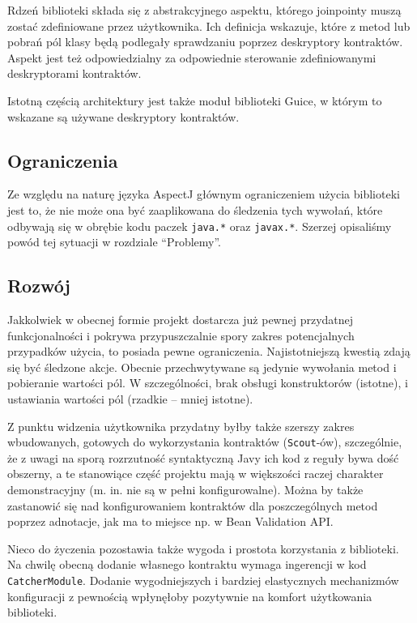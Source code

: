 \documentclass[12pt,a4paper,titlepage]{article}
\begin{document}
   Rdzeń biblioteki składa się z abstrakcyjnego aspektu, którego joinpointy muszą zostać zdefiniowane przez użytkownika. Ich definicja wskazuje, które z metod lub pobrań pól klasy będą podlegały sprawdzaniu poprzez deskryptory kontraktów. Aspekt jest też odpowiedzialny za odpowiednie sterowanie zdefiniowanymi deskryptorami kontraktów.
   
   Istotną częścią architektury jest także moduł biblioteki Guice, w którym to wskazane są używane deskryptory kontraktów.

  \subsection{Ograniczenia}
   Ze względu na naturę języka AspectJ głównym ograniczeniem użycia biblioteki jest to, że nie może ona być zaaplikowana do śledzenia tych wywołań, które odbywają się w obrębie kodu paczek \texttt{java.*} oraz \texttt{javax.*}. Szerzej opisaliśmy powód tej sytuacji w rozdziale ``Problemy''.

  \subsection{Rozwój}
   Jakkolwiek w obecnej formie projekt dostarcza już pewnej przydatnej funkcjonalności i pokrywa przypuszczalnie spory zakres potencjalnych przypadków użycia, to posiada pewne ograniczenia. Najistotniejszą kwestią zdają się być śledzone akcje. Obecnie przechwytywane są jedynie wywołania metod i pobieranie wartości pól. W szczególności, brak obsługi konstruktorów (istotne), i ustawiania wartości pól (rzadkie -- mniej istotne).

   Z punktu widzenia użytkownika przydatny byłby także szerszy zakres wbudowanych, gotowych do wykorzystania kontraktów (\texttt{Scout}-ów), szczególnie, że z uwagi na sporą rozrzutność syntaktyczną Javy ich kod z reguły bywa dość obszerny, a te stanowiące część projektu mają w większości raczej charakter demonstracyjny (m. in. nie są w pełni konfigurowalne). Można by także zastanowić się nad konfigurowaniem kontraktów dla poszczególnych metod poprzez adnotacje, jak ma to miejsce np. w Bean Validation API.

   Nieco do życzenia pozostawia także wygoda i prostota korzystania z biblioteki. Na chwilę obecną dodanie własnego kontraktu wymaga ingerencji w kod \texttt{CatcherModule}. Dodanie wygodniejszych i bardziej elastycznych mechanizmów konfiguracji z pewnością wpłynęłoby pozytywnie na komfort użytkowania biblioteki.
\end{document}
